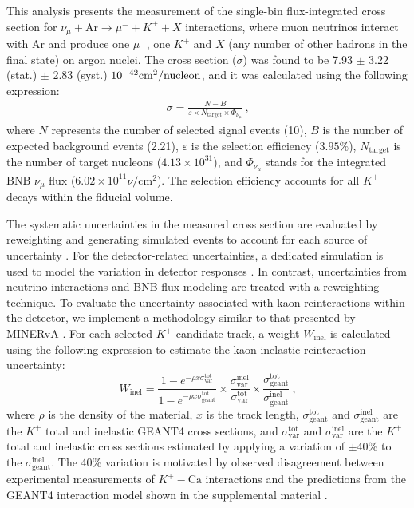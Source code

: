 \documentclass[aps,prd,longbibliography,twocolumn,showpacs,superscriptaddress,floatfix,10pt]{revtex4-1}
\begin{document}
This analysis presents the measurement of the single-bin flux-integrated cross section for $\nu_{\mu} + \text{Ar} \rightarrow \mu^{-} + K^{+} + X$ interactions, where muon neutrinos interact with Ar and produce one $\mu^{-}$, one $ K^{+}$ and $X$ (any number of other hadrons in the final state) on argon nuclei. 
The cross section ($\sigma$) was found to be 7.93 $\pm$ 3.22 (stat.) $\pm$ 2.83 (syst.) $10^{-42} \text{cm}^2/{\rm nucleon}$, and it was calculated using the following expression:
\begin{align}
\sigma = \frac{N - B}{\varepsilon \times N_{\text{target}} \times \Phi_{\nu_{\mu}}}~\text{,}
\end{align}
where $N$ represents the number of selected signal events (10),
$B$ is the number of expected background events (2.21), 
$\varepsilon$ is the selection efficiency ($3.95\%$),
$N_{\text{target}}$ is the number of target nucleons ($4.13 \times 10^{31}$), and
$\Phi_{\nu_{\mu}}$ stands for the integrated BNB $\nu_{\mu}$ flux ($6.02 \times 10^{11} \nu/\text{cm}^2$). The selection efficiency accounts for all $K^+$ decays within the fiducial volume.

The systematic uncertainties in the measured cross section are evaluated by reweighting and generating simulated events to account for each source of uncertainty \cite{MicroBooNE:2021ccs}. For the detector-related uncertainties, a dedicated simulation is used to model the variation in detector responses \cite{Abratenko_2022, Calcutt_2021}.
In contrast, uncertainties from neutrino interactions and BNB flux modeling are treated with a reweighting technique. 
To evaluate the uncertainty associated with kaon reinteractions within the detector, we implement a methodology similar to that presented by MINERvA \cite{PhysRevD.94.012002}. For each selected $K^+$ candidate track, a weight $W_{\text{inel}}$ is calculated using the following expression to estimate the kaon inelastic reinteraction uncertainty:
\begin{equation}
W_{\text{inel}} = \frac{1 - e^{-\rho x \sigma^{\text{tot}}_{\text{var}}}}{1 - e^{-\rho x \sigma^{\text{tot}}_{\text{geant}}}} \times \frac{\sigma^{\text{inel}}_{\text{var}}}{\sigma^{\text{tot}}_{\text{var}}} \times \frac{\sigma^{\text{tot}}_{\text{geant}}}{\sigma^{\text{inel}}_{\text{geant}}}~\text{,}
\label{eq:inel}
\end{equation}
where $\rho$ is the density of the material, $x$ is the track length, $\sigma^{\text{tot}}_{\text{geant}}$ and $\sigma^{\text{inel}}_{\text{geant}}$ are the $K^+$ total and inelastic GEANT4 cross sections, and $\sigma^{\text{tot}}_{\text{var}}$ and 
$\sigma^{\text{inel}}_{\text{var}}$ are the $K^+$ total and inelastic cross sections estimated by applying a variation of $\pm$40\% to the $\sigma^{\text{inel}}_{\text{geant}}$. 
The 40\% variation is motivated by observed disagreement between experimental measurements of $K^+ - \text{Ca}$ interactions \cite{PhysRevC.55.1304} and the predictions from the GEANT4 interaction model shown in the supplemental material \cite{suppmat}.
\end{document}
